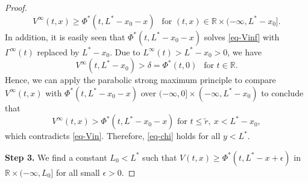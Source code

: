\documentclass[11pt]{amsart}
\numberwithin{equation}{section}
\begin{document}
\begin{proof}
\begin{equation*}
  V^\infty(t,x)\geq \Phi^*(t,L^*-x_0-x)~~ \text{ for }(t,x)\in\mathbb{R} \times (-\infty, L^*-x_0].
\end{equation*}
In addition, it is easily seen that $\Phi^*(t,L^*-x_0-x)$ solves \eqref{eq-Vinf} with $\Gamma^\infty(t)$ replaced by $L^*-x_0$. Due to $L^\infty(t)>L^*-x_0>0$, we have
\begin{equation*}
  V^\infty(t,L^*-x_0)>\delta=\Phi^*(t,0) ~~\text{ for }t\in\mathbb{R}.
\end{equation*} 
Hence, we can apply the parabolic strong maximum principle to compare $V^\infty(t,x)$ with $\Phi^*(t,L^*-x_0-x)$ over $(-\infty,0]\times (-\infty,L^*-x_0)$ to conclude that 
\begin{equation*}
  V^\infty(t,x) >\Phi^*(t,L^*-x_0-x) \text{ for }t\leq \tilde{r},\ x<L^*-x_0,
\end{equation*}
which contradicts \eqref{eq-Vin}. Therefore, \eqref{eq-chi} holds for all $y< L^*$.

\textbf{Step 3.} We find a constant $L_0<L^*$ such that  $V(t,x)\geq \Phi^*(t,L^*-x+\epsilon)$ in $\mathbb{R}\times(-\infty,L_0]$ for all small $\epsilon>0$.


\end{proof}
\end{document}

